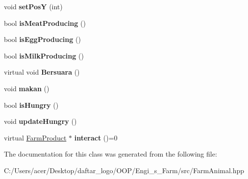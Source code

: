 \begin{DoxyCompactItemize}
void {\bfseries set\+PosY} (int)
\item 
\mbox{\label{class_farm_animal_a3c7244a2b4e29a092050da2d19a23579}} 
bool {\bfseries is\+Meat\+Producing} ()
\item 
\mbox{\label{class_farm_animal_ae3ddcc39f33304eab628492d4b3c354c}} 
bool {\bfseries is\+Egg\+Producing} ()
\item 
\mbox{\label{class_farm_animal_af1820e795edd1dfb8782e221610f7539}} 
bool {\bfseries is\+Milk\+Producing} ()
\item 
\mbox{\label{class_farm_animal_a4717ae439f9d1b1ffff1d01bb58ea595}} 
virtual void {\bfseries Bersuara} ()
\item 
\mbox{\label{class_farm_animal_a0aff6930d7226b425ea38f202e1d0357}} 
void {\bfseries makan} ()
\item 
\mbox{\label{class_farm_animal_adcfec948b4f9dd777207529006c66753}} 
bool {\bfseries is\+Hungry} ()
\item 
\mbox{\label{class_farm_animal_a9cc75d414ae6e51adbb5040e9e4a453b}} 
void {\bfseries update\+Hungry} ()
\item 
\mbox{\label{class_farm_animal_ac3f617b7cf87dad4d20de867b49410fa}} 
virtual \mbox{\hyperlink{class_farm_product}{Farm\+Product}} $\ast$ {\bfseries interact} ()=0
\end{DoxyCompactItemize}


The documentation for this class was generated from the following file\+:\begin{DoxyCompactItemize}
\item 
C\+:/\+Users/acer/\+Desktop/daftar\+\_\+logo/\+O\+O\+P/\+Engi\+\_\+s\+\_\+\+Farm/src/Farm\+Animal.\+hpp\end{DoxyCompactItemize}
